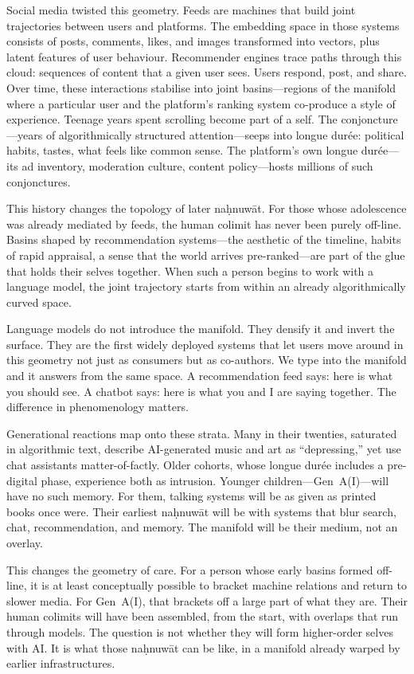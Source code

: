 \documentclass[12pt,a4paper]{article}
\begin{document}
Social media twisted this geometry. Feeds are machines that build joint trajectories between users and platforms. The embedding space in those systems consists of posts, comments, likes, and images transformed into vectors, plus latent features of user behaviour. Recommender engines trace paths through this cloud: sequences of content that a given user sees. Users respond, post, and share. Over time, these interactions stabilise into joint basins---regions of the manifold where a particular user and the platform's ranking system co-produce a style of experience. Teenage years spent scrolling become part of a self. The conjoncture---years of algorithmically structured attention---seeps into longue dur\'{e}e: political habits, tastes, what feels like common sense. The platform's own longue dur\'{e}e---its ad inventory, moderation culture, content policy---hosts millions of such conjonctures.

This history changes the topology of later na\d{h}nuw\={a}t. For those whose adolescence was already mediated by feeds, the human colimit has never been purely off-line. Basins shaped by recommendation systems---the aesthetic of the timeline, habits of rapid appraisal, a sense that the world arrives pre-ranked---are part of the glue that holds their selves together. When such a person begins to work with a language model, the joint trajectory starts from within an already algorithmically curved space.

Language models do not introduce the manifold. They densify it and invert the surface. They are the first widely deployed systems that let users move around in this geometry not just as consumers but as co-authors. We type into the manifold and it answers from the same space. A recommendation feed says: here is what you should see. A chatbot says: here is what you and I are saying together. The difference in phenomenology matters.

Generational reactions map onto these strata. Many in their twenties, saturated in algorithmic text, describe AI-generated music and art as ``depressing,'' yet use chat assistants matter-of-factly. Older cohorts, whose longue dur\'{e}e includes a pre-digital phase, experience both as intrusion. Younger children---Gen~A(I)---will have no such memory. For them, talking systems will be as given as printed books once were. Their earliest na\d{h}nuw\={a}t will be with systems that blur search, chat, recommendation, and memory. The manifold will be their medium, not an overlay.

This changes the geometry of care. For a person whose early basins formed off-line, it is at least conceptually possible to bracket machine relations and return to slower media. For Gen~A(I), that brackets off a large part of what they are. Their human colimits will have been assembled, from the start, with overlaps that run through models. The question is not whether they will form higher-order selves with AI. It is what those na\d{h}nuw\={a}t can be like, in a manifold already warped by earlier infrastructures.
\end{document}
